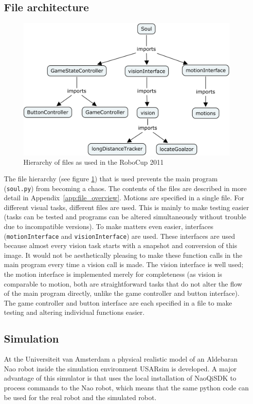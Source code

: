 \documentclass[a4paper]{article}
\begin{document}
\subsection{File architecture}
\begin{figure}[htb]    	
\centering
\includegraphics[width=0.7\columnwidth]{cmapFiles.png}
\caption{Hierarchy of files as used in the RoboCup 2011}
\label{fig:File}
\end{figure}
The file hierarchy (see figure \ref{fig:File}) that is used prevents the main program (\texttt{soul.py}) from becoming a chaos. The contents of the files are described in more detail in Appendix~\ref{app:file_overview}.
Motions are specified in a single file. 
For different visual tasks, different files are used. This is mainly to make testing easier (tasks can be tested and programs can be altered simultaneously without trouble due to incompatible versions). 
To make matters even easier, interfaces (\texttt{motionInterface} and \texttt{visionInterface}) are used. These interfaces are used because almost every vision task starts with a snapshot and conversion of this image. 
It would not be aesthetically pleasing to make these function calls in the main program every time a vision call is made. 
The vision interface is well used; the motion interface is implemented merely for completeness (as vision is comparable to motion, both are straightforward tasks that do not alter the flow of the main program directly, unlike the game controller and button interface). The game controller and button interface are each specified in a file to make testing and altering individual functions easier.



\subsection{Simulation}

At the Universiteit van Amsterdam a physical realistic model of an Aldebaran Nao robot inside the simulation environment USARsim \cite{Carpin2007icra} is developed. A major advantage of this simulator is that uses the local installation of NaoQiSDK to process commands to the Nao robot, which means that the same python code can be used for the real robot and the simulated robot. 
\end{document}
